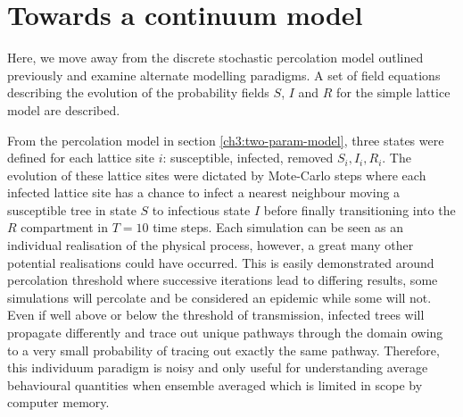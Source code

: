 \section{Towards a continuum model}
\label{a:slm-mean-field-theory}

Here, we move away from the discrete stochastic percolation model outlined previously and examine alternate modelling paradigms. 
A set of field equations describing the evolution of the probability fields $S$, $I$ and $R$ for the simple lattice model are described.

From the percolation model in section \ref{ch3:two-param-model}, three states were defined for each lattice site $i$: susceptible, infected, removed $S_i, I_i, R_i$. The evolution of these lattice sites were dictated by Mote-Carlo steps where each infected lattice site has a chance to infect a nearest neighbour moving a susceptible tree in state $S$ to infectious state $I$ before finally transitioning into the $R$ compartment in $T=10$ time steps. Each simulation can be seen as an individual realisation of the physical process, however, a great many other potential realisations could have occurred. This is easily demonstrated around percolation threshold where successive iterations lead to differing results, some simulations will percolate and be considered an epidemic while some will not. Even if well above or below the threshold of transmission, infected trees will propagate differently and trace out unique pathways through the domain owing to a very small probability of tracing out exactly the same pathway. Therefore, this individuum paradigm is noisy and only useful for understanding average behavioural quantities when ensemble averaged which is limited in scope by computer memory.

